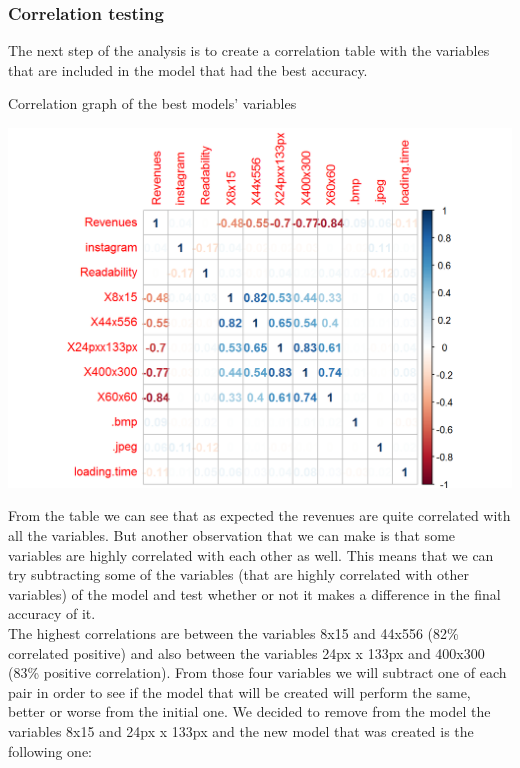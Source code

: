 \documentclass{book}
\begin{document}
\subsubsection{Correlation testing}
The next step of the analysis is to create a correlation table with the variables that are included in the model that had the best accuracy.\\
\begin{table}[H]
\centering
\caption{Correlation graph of the best models' variables}
\begin{center}
\includegraphics[scale=0.5]{../R/photos/86_model_cor.png}     \\
\end{center}
\end{table}
From the table we can see that as expected the revenues are quite correlated with all the variables. But another observation that we can make is that some variables are highly correlated with each other as well. This means that we can try subtracting some of the variables (that are highly correlated with other variables) of the model and test whether or not it makes a difference in the final accuracy of it.\\
The highest correlations are between the variables 8x15 and 44x556 (82\% correlated positive) and also between the variables 24px x 133px and 400x300 (83\% positive correlation). From those four variables we will subtract one of each pair in order to see if the model that will be created will perform the same, better or worse from the initial one. We decided to remove from the model the variables 8x15 and 24px x 133px and the new model that was created is the following one:
\end{document}
